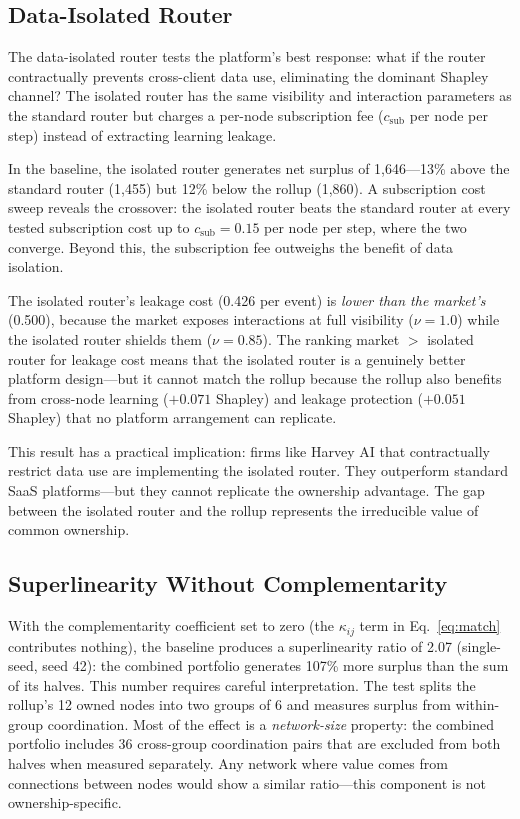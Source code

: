 \documentclass[12pt]{article}
\theoremstyle{definition}
\begin{document}
\subsection{Data-Isolated Router}
\label{sec:isolated}

The data-isolated router tests the platform's best response: what if the router contractually prevents cross-client data use, eliminating the dominant Shapley channel? The isolated router has the same visibility and interaction parameters as the standard router but charges a per-node subscription fee ($c_{\text{sub}}$ per node per step) instead of extracting learning leakage.

In the baseline, the isolated router generates net surplus of 1,646---13\% above the standard router (1,455) but 12\% below the rollup (1,860). A subscription cost sweep reveals the crossover: the isolated router beats the standard router at every tested subscription cost up to $c_{\text{sub}} = 0.15$ per node per step, where the two converge. Beyond this, the subscription fee outweighs the benefit of data isolation.

The isolated router's leakage cost (0.426 per event) is \textit{lower than the market's} (0.500), because the market exposes interactions at full visibility ($\nu = 1.0$) while the isolated router shields them ($\nu = 0.85$). The ranking market $>$ isolated router for leakage cost means that the isolated router is a genuinely better platform design---but it cannot match the rollup because the rollup also benefits from cross-node learning ($+0.071$ Shapley) and leakage protection ($+0.051$ Shapley) that no platform arrangement can replicate.

This result has a practical implication: firms like Harvey AI that contractually restrict data use are implementing the isolated router. They outperform standard SaaS platforms---but they cannot replicate the ownership advantage. The gap between the isolated router and the rollup represents the irreducible value of common ownership.

\subsection{Superlinearity Without Complementarity}
\label{sec:superlinearity}

With the complementarity coefficient set to zero (the $\kappa_{ij}$ term in Eq.~\ref{eq:match} contributes nothing), the baseline produces a superlinearity ratio of 2.07 (single-seed, seed 42): the combined portfolio generates 107\% more surplus than the sum of its halves. This number requires careful interpretation. The test splits the rollup's 12 owned nodes into two groups of 6 and measures surplus from within-group coordination. Most of the effect is a \textit{network-size} property: the combined portfolio includes 36 cross-group coordination pairs that are excluded from both halves when measured separately. Any network where value comes from connections between nodes would show a similar ratio---this component is not ownership-specific.
\end{document}

